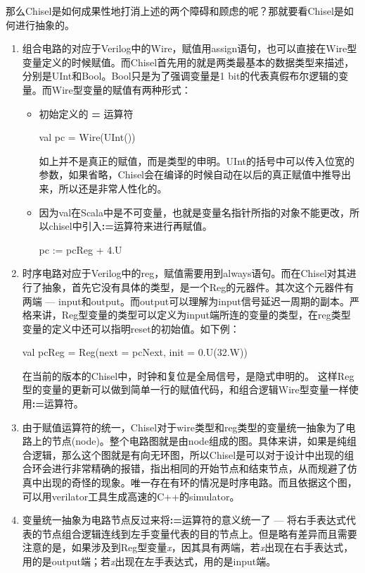 那么Chisel是如何成果性地打消上述的两个障碍和顾虑的呢？那就要看Chisel是如何进行抽象的。
\begin{enumerate}[label=(\alph*)]
	\item 组合电路的对应于Verilog中的Wire，赋值用assign语句，也可以直接在Wire型变量定义的时候赋值。而Chisel首先用的就是两类最基本的数据类型来描述，分别是UInt和Bool。Bool只是为了强调变量是1 bit的代表真假布尔逻辑的变量。而Wire型变量的赋值有两种形式：
	\begin{itemize}
		\item 初始定义的 \textbf{=} 运算符 
		\begin{scala} 
			val pc = Wire(UInt())
		\end{scala}
		
		如上并不是真正的赋值，而是类型的申明。UInt的括号中可以传入位宽的参数，如果省略，Chisel会在编译的时候自动在以后的真正赋值中推导出来，所以还是非常人性化的。
		\item 因为val在Scala中是不可变量，也就是变量名指针所指的对象不能更改，所以chisel中引入\textbf{:=}运算符来进行再赋值。
		\begin{scala} 
			pc := pcReg + 4.U 
		\end{scala}		
	\end{itemize}
	\item 时序电路对应于Verilog中的reg，赋值需要用到always语句。而在Chisel对其进行了抽象，首先它没有具体的类型，是一个Reg的元器件。其次这个元器件有两端 --- input和output。而output可以理解为input信号延迟一周期的副本。严格来讲，Reg型变量的类型可以定义为input端所连的变量的类型，在reg类型变量的定义中还可以指明reset的初始值。如下例：
	\begin{scala}
		val pcReg = Reg(next = pcNext, init = 0.U(32.W))
	\end{scala}
	在当前的版本的Chisel中，时钟和复位是全局信号，是隐式申明的\citep{chisel2017}。
	这样Reg型的变量的更新可以做到简单一行的赋值代码，和组合逻辑Wire型变量一样使用\textbf{:=}运算符。
	\item 由于赋值运算符的统一，Chisel对于wire类型和reg类型的变量统一抽象为了电路上的节点(node)。整个电路图就是由node组成的图。具体来讲，如果是纯组合逻辑，那么这个图就是有向无环图，所以Chisel是可以对于设计中出现的组合环会进行非常精确的报错，指出相同的开始节点和结束节点，从而规避了仿真中出现的奇怪的现象。唯一存在有环的情况是时序电路。而且依据这个图，可以用verilator工具生成高速的C++的simulator\citep{chisel2017}。
	\item 变量统一抽象为电路节点反过来将\textbf{:=}运算符的意义统一了 --- 将右手表达式代表的节点组合逻辑连线到左手变量代表的目的节点上。但是略有差异而且需要注意的是，如果涉及到Reg型变量\textit{x}，因其具有两端，若\textit{x}出现在右手表达式，用的是output端；若\textit{x}出现在左手表达式，用的是input端\citep{chisel2017}。
	

\end{enumerate}
